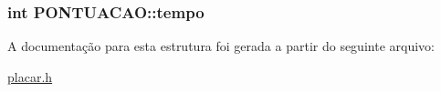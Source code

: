 \subsubsection[{tempo}]{\setlength{\rightskip}{0pt plus 5cm}int P\+O\+N\+T\+U\+A\+C\+A\+O\+::tempo}\label{structPONTUACAO_ae90e645ea891d3dff0d43b9a191b4d89}


A documentação para esta estrutura foi gerada a partir do seguinte arquivo\+:\begin{DoxyCompactItemize}
\item 
\hyperlink{placar_8h}{placar.\+h}\end{DoxyCompactItemize}
